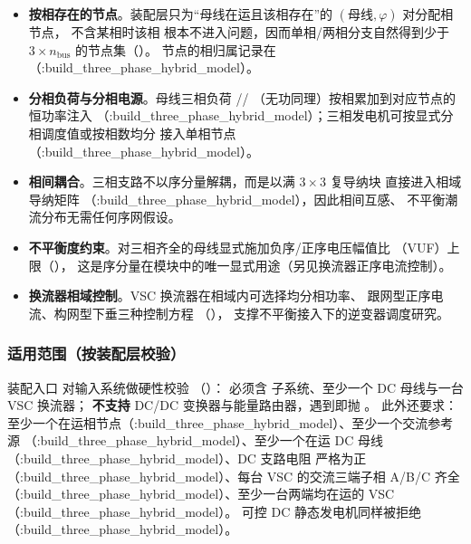 \begin{itemize}
  \item \textbf{按相存在的节点}。装配层只为“母线在运且该相存在”的
        $(\text{母线},\varphi)$ 对分配相节点， 不含某相时该相
        根本不进入问题，因而单相/两相分支自然得到少于 $3\times n_{\mathrm{bus}}$
        的节点集（）。
        节点的相归属记录在 （:build\_three\_phase\_hybrid\_model）。
  \item \textbf{分相负荷与分相电源}。母线三相负荷 //%
        （无功同理）按相累加到对应节点的恒功率注入
        （:build\_three\_phase\_hybrid\_model）；三相发电机可按显式分相调度值或按相数均分
        接入单相节点（:build\_three\_phase\_hybrid\_model）。
  \item \textbf{相间耦合}。三相支路不以序分量解耦，而是以满 $3\times 3$ 复导纳块
        直接进入相域导纳矩阵 （:build\_three\_phase\_hybrid\_model），因此相间互感、
        不平衡潮流分布无需任何序网假设。
  \item \textbf{不平衡度约束}。对三相齐全的母线显式施加负序/正序电压幅值比
        （VUF）上限（），
        这是序分量在模块中的唯一显式用途（另见换流器正序电流控制）。
  \item \textbf{换流器相域控制}。VSC 换流器在相域内可选择均分相功率、
        跟网型正序电流、构网型下垂三种控制方程
        （），
        支撑不平衡接入下的逆变器调度研究。
\end{itemize}

\subsubsection*{适用范围（按装配层校验）}
装配入口  对输入系统做硬性校验
（）：
必须含  子系统、至少一个 DC 母线与一台 VSC 换流器；
\textbf{不支持} DC/DC 变换器与能量路由器，遇到即抛 。
此外还要求：至少一个在运相节点（:build\_three\_phase\_hybrid\_model）、至少一个交流参考源
（:build\_three\_phase\_hybrid\_model）、至少一个在运 DC 母线（:build\_three\_phase\_hybrid\_model）、DC 支路电阻
严格为正（:build\_three\_phase\_hybrid\_model）、每台 VSC 的交流三端子相 A/B/C 齐全
（:build\_three\_phase\_hybrid\_model）、至少一台两端均在运的 VSC（:build\_three\_phase\_hybrid\_model）。
可控 DC 静态发电机同样被拒绝（:build\_three\_phase\_hybrid\_model）。

